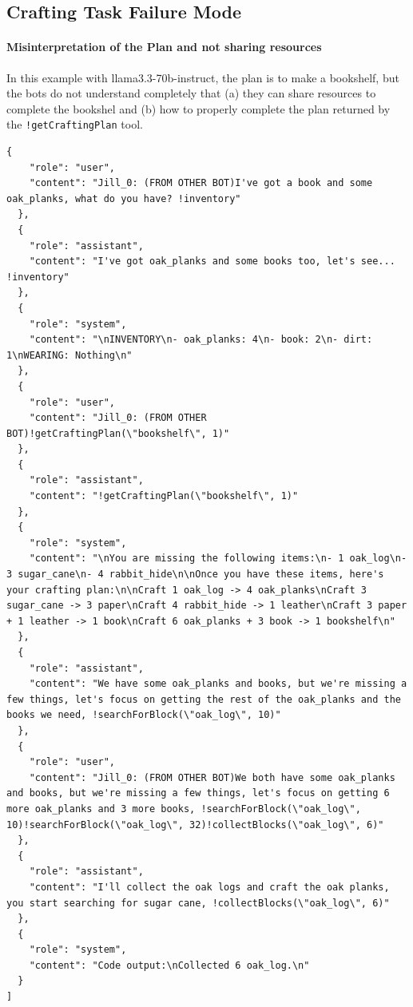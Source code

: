 \documentclass{article}
\begin{document}
\subsection{Crafting Task Failure Mode} \label{appendix: crafting-task-fail}

\paragraph{Misinterpretation of the Plan and not sharing resources}
In this example with llama3.3-70b-instruct, the plan is to make a bookshelf, but the bots do not understand completely that (a) they can share resources to complete the bookshel and (b) how to properly complete the plan returned by the \verb_!getCraftingPlan_ tool. 

\begin{lstlisting}
{
    "role": "user",
    "content": "Jill_0: (FROM OTHER BOT)I've got a book and some oak_planks, what do you have? !inventory"
  },
  {
    "role": "assistant",
    "content": "I've got oak_planks and some books too, let's see... !inventory"
  },
  {
    "role": "system",
    "content": "\nINVENTORY\n- oak_planks: 4\n- book: 2\n- dirt: 1\nWEARING: Nothing\n"
  },
  {
    "role": "user",
    "content": "Jill_0: (FROM OTHER BOT)!getCraftingPlan(\"bookshelf\", 1)"
  },
  {
    "role": "assistant",
    "content": "!getCraftingPlan(\"bookshelf\", 1)"
  },
  {
    "role": "system",
    "content": "\nYou are missing the following items:\n- 1 oak_log\n- 3 sugar_cane\n- 4 rabbit_hide\n\nOnce you have these items, here's your crafting plan:\n\nCraft 1 oak_log -> 4 oak_planks\nCraft 3 sugar_cane -> 3 paper\nCraft 4 rabbit_hide -> 1 leather\nCraft 3 paper + 1 leather -> 1 book\nCraft 6 oak_planks + 3 book -> 1 bookshelf\n"
  },
  {
    "role": "assistant",
    "content": "We have some oak_planks and books, but we're missing a few things, let's focus on getting the rest of the oak_planks and the books we need, !searchForBlock(\"oak_log\", 10)"
  },
  {
    "role": "user",
    "content": "Jill_0: (FROM OTHER BOT)We both have some oak_planks and books, but we're missing a few things, let's focus on getting 6 more oak_planks and 3 more books, !searchForBlock(\"oak_log\", 10)!searchForBlock(\"oak_log\", 32)!collectBlocks(\"oak_log\", 6)"
  },
  {
    "role": "assistant",
    "content": "I'll collect the oak logs and craft the oak planks, you start searching for sugar cane, !collectBlocks(\"oak_log\", 6)"
  },
  {
    "role": "system",
    "content": "Code output:\nCollected 6 oak_log.\n"
  }
]
\end{lstlisting}
\end{document}
